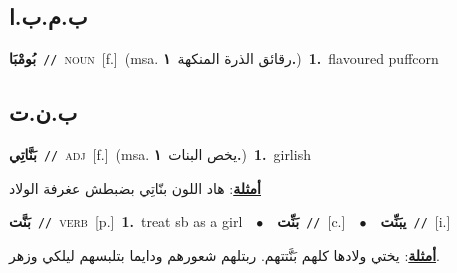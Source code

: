 \documentclass[10pt,a4paper,twoside]{article} %
\begin{document}
\begin{multicols}{2}
\vspace{-3mm}
\subsection*{\color{blue}\foreignlanguage{arabic}{ب.م.ب.ا}\color{blue}{ (ntws)}} 

{\setlength\topsep{0pt}\textbf{\foreignlanguage{arabic}{بُومْبَا}}\ {\color{gray}\texttt{//}\color{black}}\ \textsc{noun}\ [f.]\ \color{gray}(msa. \foreignlanguage{arabic}{رقائق الذرة المنكهة}~\foreignlanguage{arabic}{\textbf{١.}})\color{black}\ \textbf{1.}~flavoured puffcorn\ } \vspace{2mm}

\vspace{-3mm}
\subsection*{\color{blue}\foreignlanguage{arabic}{ب.ن.ت}\color{blue}{}} 

{\setlength\topsep{0pt}\textbf{\foreignlanguage{arabic}{بَنَّاتِي}}\ {\color{gray}\texttt{//}\color{black}}\ \textsc{adj}\ [f.]\ \color{gray}(msa. \foreignlanguage{arabic}{يخص البنات}~\foreignlanguage{arabic}{\textbf{١.}})\color{black}\ \textbf{1.}~girlish\  \begin{flushright}\color{gray}\foreignlanguage{arabic}{\textbf{\underline{\foreignlanguage{arabic}{أمثلة}}}: هاد اللون بنّاتِي بضبطش عغرفة الولاد}\end{flushright}\color{black}} \vspace{2mm}

{\setlength\topsep{0pt}\textbf{\foreignlanguage{arabic}{بَنَّت}}\ {\color{gray}\texttt{//}\color{black}}\ \textsc{verb}\ [p.]\ \textbf{1.}~treat sb as a girl\ \ $\bullet$\ \ \setlength\topsep{0pt}\textbf{\foreignlanguage{arabic}{بَنِّت}}\ {\color{gray}\texttt{//}\color{black}}\ [c.]\ \ $\bullet$\ \ \setlength\topsep{0pt}\textbf{\foreignlanguage{arabic}{يبَنِّت}}\ {\color{gray}\texttt{//}\color{black}}\ [i.]\  \begin{flushright}\color{gray}\foreignlanguage{arabic}{\textbf{\underline{\foreignlanguage{arabic}{أمثلة}}}: يختي ولادها كلهم بَنَّتتهم. ربتلهم شعورهم ودايما بتلبسهم ليلكي وزهر.}\end{flushright}\color{black}} \vspace{2mm}


\end{multicols}
\end{document}
